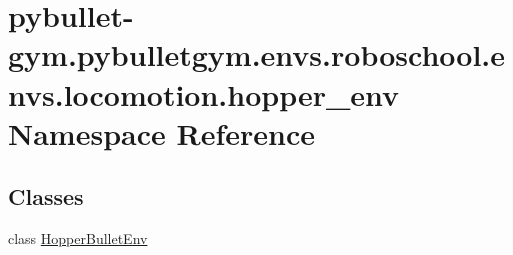 \hypertarget{namespacepybullet-gym_1_1pybulletgym_1_1envs_1_1roboschool_1_1envs_1_1locomotion_1_1hopper__env}{}\section{pybullet-\/gym.pybulletgym.\+envs.\+roboschool.\+envs.\+locomotion.\+hopper\+\_\+env Namespace Reference}
\label{namespacepybullet-gym_1_1pybulletgym_1_1envs_1_1roboschool_1_1envs_1_1locomotion_1_1hopper__env}
\subsection*{Classes}
\begin{DoxyCompactItemize}
\item 
class \hyperlink{classpybullet-gym_1_1pybulletgym_1_1envs_1_1roboschool_1_1envs_1_1locomotion_1_1hopper__env_1_1_hopper_bullet_env}{Hopper\+Bullet\+Env}
\end{DoxyCompactItemize}
